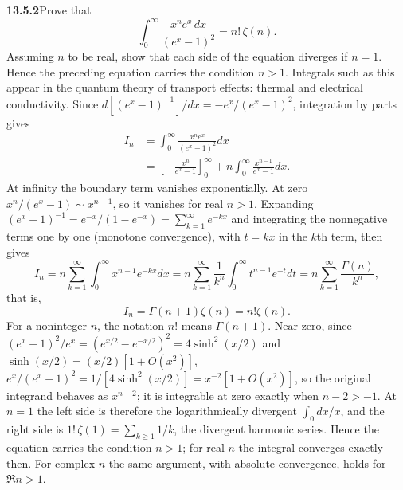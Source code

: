 \par\bigskip
\noindent\textbf{13.5.2}\quad Prove that
\[
\int_{0}^{\infty}\frac{x^{n}e^{x}\,dx}{(e^{x}-1)^{2}}=n!\,\zeta(n).
\]
Assuming $n$ to be real, show that each side of the equation diverges if
$n=1$. Hence the preceding equation carries the condition $n>1$. Integrals
such as this appear in the quantum theory of transport effects: thermal and
electrical conductivity.
\solution
Since $d[(e^x-1)^{-1}]/dx=-e^x/(e^x-1)^2$, integration by
parts gives
\begin{align*}
I_n&=\int_0^\infty\frac{x^ne^x}{(e^x-1)^2}dx\\
&=\left[-\frac{x^n}{e^x-1}\right]_0^\infty
+n\int_0^\infty\frac{x^{n-1}}{e^x-1}dx.
\end{align*}
At infinity the boundary term vanishes exponentially.  At zero
$x^n/(e^x-1)\sim x^{n-1}$, so it vanishes for real $n>1$.
Expanding $(e^x-1)^{-1}=e^{-x}/(1-e^{-x})=\sum_{k=1}^\infty e^{-kx}$
and integrating the nonnegative terms one by one (monotone
convergence), with $t=kx$ in the $k$th term, then gives
\[
I_n=n\sum_{k=1}^{\infty}\int_0^\infty x^{n-1}e^{-kx}dx
=n\sum_{k=1}^{\infty}\frac1{k^n}\int_0^\infty t^{n-1}e^{-t}dt
=n\sum_{k=1}^{\infty}\frac{\Gamma(n)}{k^n},
\]
that is,
\[
I_n=\boxed{\Gamma(n+1)\zeta(n)=n!\zeta(n)}.
\]
For a noninteger $n$, the notation $n!$ means $\Gamma(n+1)$.
Near zero, since $(e^x-1)^2/e^x=(e^{x/2}-e^{-x/2})^2=4\sinh^2(x/2)$
and $\sinh(x/2)=(x/2)[1+O(x^2)]$,
$e^x/(e^x-1)^2=1/[4\sinh^2(x/2)]=x^{-2}[1+O(x^2)]$, so
the original integrand behaves as $x^{n-2}$; it is integrable at
zero exactly when $n-2>-1$.  At $n=1$ the left side is
therefore the logarithmically divergent $\int_0 dx/x$, and the
right side is $1!\,\zeta(1)=\sum_{k\ge1}1/k$, the divergent
harmonic series.  Hence the equation carries the condition
$n>1$; for real $n$ the integral converges exactly then.  For
complex $n$ the same argument, with absolute convergence, holds
for $\Re n>1$.


